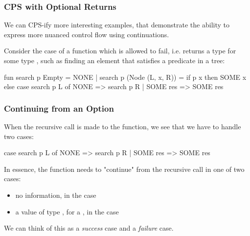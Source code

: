 \documentclass[aspectratio=169]{beamer}
\begin{document}

\begin{frame}[fragile]
  \frametitle{CPS with Optional Returns}

  We can CPS-ify more interesting examples, that demonstrate the
  ability to express more nuanced control flow using continuations.

  \pause
  \vspace{\fill}

  Consider the case of a function which is allowed to fail, i.e.
  returns a type  for some type , such as
  finding an element that satisfies a predicate in a tree:

  \begin{codeblock}
    fun search p Empty = NONE
      | search p (Node (L, x, R)) =
          if p x then
            SOME x
          else
            case search p L of
              NONE => search p R
            | SOME res => SOME res
  \end{codeblock}
\end{frame}

\begin{frame}[fragile]
  \frametitle{Continuing from an Option}

  When the recursive call is made to the function, we see that we have to handle
  two cases:
  \begin{codeblock}
    case search p L of
      NONE => search p R
    | SOME res => SOME res
  \end{codeblock}

  \pause
  \vspace{\fill}

  In essence, the function needs to "continue" from the recursive call in
  one of two cases:
  \begin{itemize}
    \item no information, in the  case \pause
    \item a value of type , for a , in the  case
  \end{itemize}

  \pause
  \vspace{\fill}

  We can think of this as a \textit{success} case and a \textit{failure} case.
\end{frame}
\end{document}
